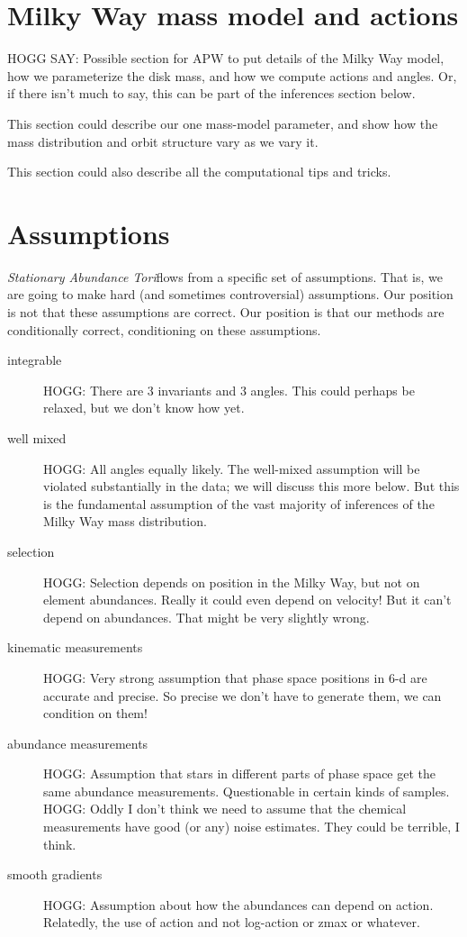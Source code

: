 \documentclass[modern]{aastex63}
\newcommand{\methodname}{\textsl{Stationary Abundance Tori}}
\begin{document}
\section{Milky Way mass model and actions}

HOGG SAY: Possible section for APW to put details of the Milky Way model,
how we parameterize the disk mass, and how we compute actions and angles.
Or, if there isn't much to say, this can be part of the inferences section
below.

This section could describe our one mass-model parameter, and show how
the mass distribution and orbit structure vary as we vary it.

This section could also describe all the computational tips and tricks.

\section{Assumptions}

\methodname flows from a specific set of assumptions.
That is, we are going to make hard (and sometimes controversial) assumptions.
Our position is not that these assumptions are correct.
Our position is that our
methods are conditionally correct, conditioning on these assumptions.
\begin{description}
\item[integrable] HOGG: There are 3 invariants and 3 angles. This could perhaps be
  relaxed, but we don't know how yet.

\item[well mixed] HOGG: All angles equally likely.
  The well-mixed assumption will be violated substantially in the data;
  we will discuss this more below. But this is the fundamental assumption of
  the vast majority of inferences of the Milky Way mass distribution.

\item[selection] HOGG: Selection depends on position in the Milky Way, but not
  on element abundances. Really it could even depend on velocity! But it can't depend
  on abundances. That might be very slightly wrong.

\item[kinematic measurements] HOGG: Very strong assumption that phase space positions
  in 6-d are accurate and precise. So precise we don't have to generate them, we can
  condition on them!

\item[abundance measurements] HOGG: Assumption that stars in different parts of phase
  space get the same abundance measurements. Questionable in certain kinds of samples.
  HOGG: Oddly I don't think we need to assume that the chemical measurements have good
  (or any) noise estimates. They could be terrible, I think.

\item[smooth gradients] HOGG: Assumption about how the abundances can
  depend on action. Relatedly, the use of action and not log-action
  or zmax or whatever.
\end{description}
\end{document}
